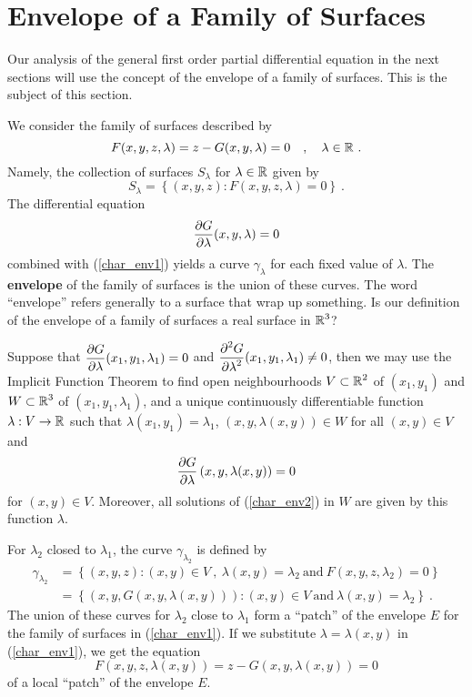 \section{Envelope of a Family of Surfaces}

Our analysis of the general first order partial differential equation
in the next sections will use the concept of the envelope of a family
of surfaces.   This is the subject of this section.

We consider the family of surfaces described by
\begin{equation} \label{char_env1}
F(x,y,z,\lambda) = z - G(x,y,\lambda) = 0 \quad , \quad \lambda \in \mathbb{R} \ .
\end{equation}
Namely, the collection of surfaces $S_\lambda$ for $\lambda \in \mathbb{R}$
given by
\[
S_\lambda = \left\{ (x,y,z) : F(x,y,z,\lambda) = 0 \right\} \ .
\]
The differential equation
\begin{equation} \label{char_env2}
\frac{\partial{G}}{\partial \lambda}(x,y,\lambda) = 0
\end{equation}
combined with (\ref{char_env1}) yields a curve $\gamma_\lambda$ for
each fixed value of $\lambda$.
The {\bfseries envelope}
of the family of surfaces is the union of these curves.  The word
``envelope'' refers generally to a surface that wrap up something.
Is our definition of the envelope of a family of surfaces a real surface
in $\displaystyle \mathbb{R}^3$?

Suppose that
$\displaystyle \frac{\partial{G}}{\partial \lambda}(x_1,y_1,\lambda_1) = 0$
and
$\displaystyle \frac{\displaystyle \partial^{2}{G}} {\displaystyle \partial \lambda^{2}}(x_1,y_1,\lambda_1) \neq 0$, then
we may use the Implicit Function Theorem to find open neighbourhoods
$\displaystyle V \subset \mathbb{R}^2$ of $(x_1,y_1)$ and
$\displaystyle W \subset \mathbb{R}^3$ of
$(x_1,y_1,\lambda_1)$, and a unique continuously
differentiable function $\lambda:V\to \mathbb{R}$ such that
$\lambda(x_1,y_1) = \lambda_1$,
$(x,y,\lambda(x,y)) \in W$ for all $(x,y) \in V$ and
\begin{equation} \label{char_env3}
\frac{\partial{G}}{\partial \lambda}\left(x,y,\lambda(x,y)\right) = 0
\end{equation}
for $(x,y) \in V$.  Moreover, all solutions of (\ref{char_env2}) in $W$
are given by this function $\lambda$.

For $\lambda_2$ closed to $\lambda_1$, the curve $\gamma_{\lambda_2}$
is defined by
\begin{align*}
\gamma_{\lambda_2} &= \left\{ (x,y,z) : (x,y) \in V \ ,
\ \lambda(x,y) = \lambda_2 \ \text{and} \ F(x,y,z,\lambda_2) = 0 \right\} \\
&= \left\{ (x,y,G(x,y,\lambda(x,y))) : (x,y) \in V \ \text{and}
\ \lambda(x,y) = \lambda_2 \right\} \ .
\end{align*}
The union of these curves for $\lambda_2$ close to $\lambda_1$ form a
``patch'' of the envelope $E$ for the family of surfaces in
(\ref{char_env1}).  If we substitute $\lambda = \lambda(x,y)$ in
(\ref{char_env1}), we get the equation
\[
F(x,y,z,\lambda(x,y)) = z - G(x,y,\lambda(x,y)) = 0
\]
of a local ``patch'' of the envelope $E$.

